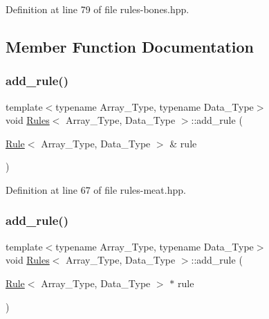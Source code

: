 Definition at line 79 of file rules-\/bones.\+hpp.



\subsection{Member Function Documentation}
\mbox{\label{class_rules_a60583152fddcb11178dcf3d02a924d7c}} 
\subsubsection{\texorpdfstring{add\+\_\+rule()}{add\_rule()}\hspace{0.1cm}{\footnotesize\ttfamily [1/3]}}
{\footnotesize\ttfamily template$<$typename Array\+\_\+\+Type, typename Data\+\_\+\+Type$>$ \\
void \hyperlink{class_rules}{Rules}$<$ Array\+\_\+\+Type, Data\+\_\+\+Type $>$\+::add\+\_\+rule (\begin{DoxyParamCaption}\item[{\hyperlink{class_rule}{Rule}$<$ Array\+\_\+\+Type, Data\+\_\+\+Type $>$ \&}]{rule }\end{DoxyParamCaption})\hspace{0.3cm}{\ttfamily [inline]}}



Definition at line 67 of file rules-\/meat.\+hpp.

\mbox{\label{class_rules_abd60b1d381ad0c8a772e4d81264bbe0a}} 
\subsubsection{\texorpdfstring{add\+\_\+rule()}{add\_rule()}\hspace{0.1cm}{\footnotesize\ttfamily [2/3]}}
{\footnotesize\ttfamily template$<$typename Array\+\_\+\+Type, typename Data\+\_\+\+Type$>$ \\
void \hyperlink{class_rules}{Rules}$<$ Array\+\_\+\+Type, Data\+\_\+\+Type $>$\+::add\+\_\+rule (\begin{DoxyParamCaption}\item[{\hyperlink{class_rule}{Rule}$<$ Array\+\_\+\+Type, Data\+\_\+\+Type $>$ $\ast$}]{rule }\end{DoxyParamCaption})\hspace{0.3cm}{\ttfamily [inline]}}



